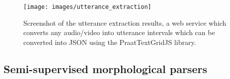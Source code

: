 \documentclass[11pt]{article}
\newcommand{\smalltodo}[2][]
    {\todo[caption={#2}, #1]
    {\tiny#2\normalsize}}
\begin{document}
\begin{figure}
\begin{center}
\texttt{[image: images/utterance\_extraction]}
\caption{Screenshot of the utterance extraction results, a web service which
converts any audio/video into utterance intervals which can be converted into
JSON using the PraatTextGridJS library.}

\label{utterance_extraction_screenshot}
\end{center}
\end{figure}

\subsection{Semi-supervised morphological parsers}

\end{document}
